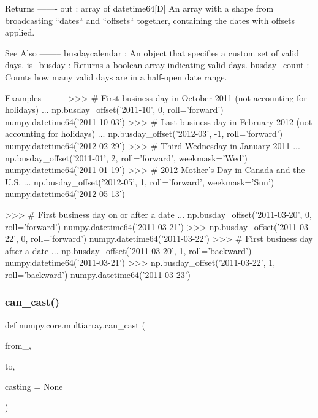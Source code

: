 \begin{DoxyVerb}
Returns
-------
out : array of datetime64[D]
    An array with a shape from broadcasting ``dates`` and ``offsets``
    together, containing the dates with offsets applied.

See Also
--------
busdaycalendar : An object that specifies a custom set of valid days.
is_busday : Returns a boolean array indicating valid days.
busday_count : Counts how many valid days are in a half-open date range.

Examples
--------
>>> # First business day in October 2011 (not accounting for holidays)
... np.busday_offset('2011-10', 0, roll='forward')
numpy.datetime64('2011-10-03')
>>> # Last business day in February 2012 (not accounting for holidays)
... np.busday_offset('2012-03', -1, roll='forward')
numpy.datetime64('2012-02-29')
>>> # Third Wednesday in January 2011
... np.busday_offset('2011-01', 2, roll='forward', weekmask='Wed')
numpy.datetime64('2011-01-19')
>>> # 2012 Mother's Day in Canada and the U.S.
... np.busday_offset('2012-05', 1, roll='forward', weekmask='Sun')
numpy.datetime64('2012-05-13')

>>> # First business day on or after a date
... np.busday_offset('2011-03-20', 0, roll='forward')
numpy.datetime64('2011-03-21')
>>> np.busday_offset('2011-03-22', 0, roll='forward')
numpy.datetime64('2011-03-22')
>>> # First business day after a date
... np.busday_offset('2011-03-20', 1, roll='backward')
numpy.datetime64('2011-03-21')
>>> np.busday_offset('2011-03-22', 1, roll='backward')
numpy.datetime64('2011-03-23')
\end{DoxyVerb}
 \mbox{\label{namespacenumpy_1_1core_1_1multiarray_a01e06910ded7e94fc6e385ef96e8d0a1}} 
\subsubsection{\texorpdfstring{can\+\_\+cast()}{can\_cast()}}
{\footnotesize\ttfamily def numpy.\+core.\+multiarray.\+can\+\_\+cast (\begin{DoxyParamCaption}\item[{}]{from\+\_\+,  }\item[{}]{to,  }\item[{}]{casting = {\ttfamily None} }\end{DoxyParamCaption})}

